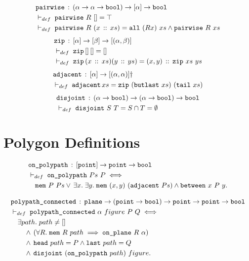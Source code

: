 \begin{align*}
  & \code{pairwise}\,:\,(\alpha \rightarrow \alpha \rightarrow \code{bool}) \rightarrow [\alpha] \rightarrow \code{bool}\\
  & \vdash_{def}\;\code{pairwise}\ R\ [] = \top\\
  & \vdash_{def}\;\code{pairwise}\ R\ (\cons{x}{xs}) = \code{all}\ (R x)\ xs \wedge \code{pairwise}\ R\ xs
\end{align*}
\begin{align*}
  & \texttt{zip}\,:\,[\alpha]\rightarrow[\beta]\rightarrow[(\alpha,\beta)]\\
  & \vdash_{def}\;\texttt{zip}\,[]\,[] = []\\
  & \vdash_{def}\;\texttt{zip}\,(x\,::\,xs)(y\,::\,ys) = (x,y)\,::\,\texttt{zip}\ xs\ ys
\end{align*}
\begin{align*}
  & \code{adjacent}\,:\,[\alpha]\rightarrow[(\alpha,\alpha)]\dag\\
  & \vdash_{def}\;\code{adjacent}\,xs = \code{zip}\ (\code{butlast}\ xs)\ (\code{tail}\ xs)
\end{align*}
\begin{align*}
  & \texttt{disjoint}\,:\,(\alpha\rightarrow\texttt{bool})\rightarrow(\alpha\rightarrow\texttt{bool})\rightarrow\texttt{bool}\\
  & \vdash_{def}\;\texttt{disjoint}\ S\ T = S \cap T = \emptyset
\end{align*}

\section{Polygon Definitions}
\begin{align*}
  &\code{on\_polypath}\,:\,[\code{point}] \rightarrow \code{point} \rightarrow \code{bool}\\
  &\vdash_{def}\;\code{on\_polypath}\ Ps\ P \iff\\
  &\quad\code{mem}\ P\ Ps\vee\,\exists x.\;\exists y.\; \code{mem}\ (x,y)\ (\code{adjacent}\ Ps) \wedge \between{x}{P}{y}.
\end{align*}

\begin{align*}
  &\code{polypath\_connected}\,:\,\code{plane}\rightarrow(\code{point} \rightarrow \code{bool}) \rightarrow \code{point} \rightarrow \code{point} \rightarrow \code{bool}\\
  &\vdash_{def}\;\code{polypath\_connected}\ \alpha\ figure\ P\ Q \iff\\
  &\quad\exists path.\; path \neq []\\
  &\qquad\wedge\,(\forall R.\;\code{mem}\ R\ path \implies \onplane{R}{\alpha})\\
  &\qquad\wedge\,\code{head}\ path = P \wedge \code{last}\ path = Q\\
  &\qquad\wedge\,\code{disjoint}\ (\code{on\_polypath}\ path)\ figure.
\end{align*}

